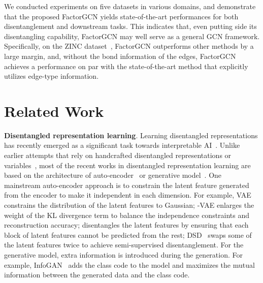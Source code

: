 \documentclass{article}
\begin{document}
We conducted experiments on five datasets
in various domains,
and demonstrate that the proposed FactorGCN
yields state-of-the-art performances 
for both disentanglement and
downstream tasks.
This indicates that,
even putting side its disentangling capability, 
FactorGCN may well serve as a general GCN framework. 
Specifically, on the ZINC dataset~\citep{jin2018junctionZINC},
FactorGCN outperforms other methods by a large margin,
and, without {the bond information of the edges},
FactorGCN achieves a performance on par with the state-of-the-art
method that explicitly {utilizes}
edge-type information.

\iffalse
For two of them, ground truhts of the 
disentangled factor graphs are available;
on these two datasets,
FactorGCN performs consistently the best
in terms of both the disentanglement performance 
and the downstream task performance.
The other three datasets are from 

social network 
and bioinformatics graph, 
on which FactorGCN 
achieves the state-of-the-art performance,
showing that it is ready 
to be used as a general GCN framework.  
Specifically, on the ZINC dataset, our method
outperforms the other methods by a large margin
and achieve a similar performance as the state-of-the-art
method that explicitly \emph{utilizes} the type information of edges,
indicating that the disentangled factor graphs can 
indeed boost results of the downstream tasks.
\fi

\section{Related Work}

\textbf{Disentangled representation learning}. 
Learning disentangled representations has recently
emerged as a significant task towards 
interpretable AI~\citep{yang2020ECCV,Song_2020_CVPR}.
Unlike earlier attempts that rely on 
handcrafted disentangled representations
or variables~\citep{WangECCV14,WangTPAMI16}, 
most of the recent works
in disentangled representation learning are based on the architecture
of auto-encoder~\citep{higgins2017betaVAE,feng2018dual,bouchacourt2018multi,burgess2018understanding,wang2017tag,kim2018disentangling} 
or generative
model~\citep{chen2016infogan,zhao2017learning,siddharth2017learning}.
One mainstream auto-encoder approach is to constrain
the latent feature generated from the encoder to make it independent
in each dimension. For example, VAE~\citep{kingma2013autovae}
constrains the distribution of the latent features to Gaussian;
-VAE\citep{higgins2017betaVAE}
enlarges the weight of the KL divergence term to 
balance the independence constraints and reconstruction accuracy;
\citep{schmidhuber1992learning} disentangles the latent features by
ensuring that each block of latent features cannot be predicted
from the rest; 
DSD~\citep{feng2018dual} swaps some of the latent features
twice to achieve semi-supervised disentanglement. 
For the generative model, extra information is introduced during the
generation. For example, InfoGAN~\citep{chen2016infogan} adds the class code to 
the model and maximizes the mutual information between the
generated data and the class code.
\end{document}
